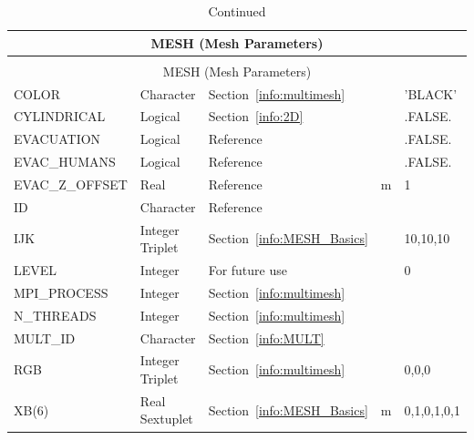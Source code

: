 \documentclass[11pt]{book}
\begin{document}
\begin{longtable}{@{\extracolsep{\fill}}|l|l|l|l|l|}
\caption[Mesh parameters ({\ct MESH} namelist group)]{For more information see Section~\ref{info:MESH}.}
\label{tbl:MESH} \\
\hline
\multicolumn{5}{|c|}{{\ct MESH} (Mesh Parameters)} \\
\hline \hline
\endfirsthead
\caption[]{Continued} \\
\hline
\multicolumn{5}{|c|}{{\ct MESH} (Mesh Parameters)} \\
\hline \hline
\endhead
{\ct COLOR}                & Character                     & Section~\ref{info:multimesh}              &    & {\ct 'BLACK'}    \\ \hline
{\ct CYLINDRICAL}          & Logical                       & Section~\ref{info:2D}                     &    & {\ct .FALSE.}    \\ \hline
{\ct EVACUATION}           & Logical                       & Reference~\cite{FDS_Evac_Users_Guide}     &    & {\ct .FALSE.}    \\ \hline
{\ct EVAC\_HUMANS}         & Logical                       & Reference~\cite{FDS_Evac_Users_Guide}     &    & {\ct .FALSE.}    \\ \hline
{\ct EVAC\_Z\_OFFSET}      & Real                          & Reference~\cite{FDS_Evac_Users_Guide}     & m  & 1                \\ \hline
{\ct ID}                   & Character                     & Reference~\cite{FDS_Evac_Users_Guide}     &    &                  \\ \hline
{\ct IJK}                  & Integer Triplet               & Section~\ref{info:MESH_Basics}            &    & 10,10,10         \\ \hline
{\ct LEVEL}                & Integer                       & For future use                            &    & 0                \\ \hline
{\ct MPI\_PROCESS}         & Integer                       & Section~\ref{info:multimesh}              &    &                  \\ \hline
{\ct N\_THREADS}           & Integer                       & Section~\ref{info:multimesh}              &    &                  \\ \hline
{\ct MULT\_ID }            & Character                     & Section~\ref{info:MULT}                   &    &                  \\ \hline
{\ct RGB}                  & Integer Triplet               & Section~\ref{info:multimesh}              &    & 0,0,0            \\ \hline
{\ct XB(6)}                & Real Sextuplet                & Section~\ref{info:MESH_Basics}            & m  & 0,1,0,1,0,1      \\ \hline
\end{longtable}
\end{document}
